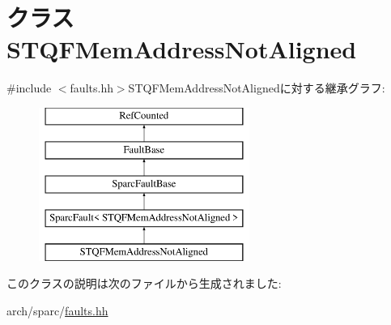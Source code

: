 \hypertarget{classSparcISA_1_1STQFMemAddressNotAligned}{
\section{クラス STQFMemAddressNotAligned}
\label{classSparcISA_1_1STQFMemAddressNotAligned}
}


{\ttfamily \#include $<$faults.hh$>$}STQFMemAddressNotAlignedに対する継承グラフ:\begin{figure}[H]
\begin{center}
\leavevmode
\includegraphics[height=5cm]{classSparcISA_1_1STQFMemAddressNotAligned}
\end{center}
\end{figure}


このクラスの説明は次のファイルから生成されました:\begin{DoxyCompactItemize}
\item 
arch/sparc/\hyperlink{arch_2sparc_2faults_8hh}{faults.hh}\end{DoxyCompactItemize}
